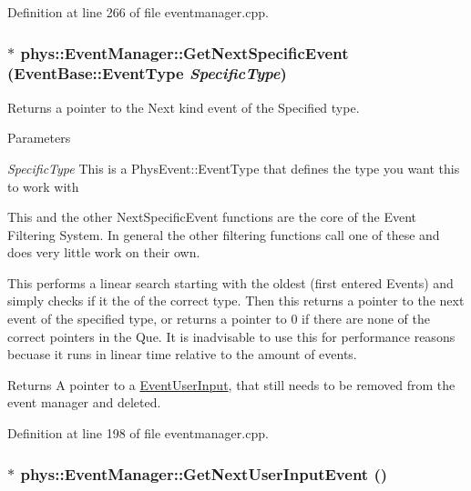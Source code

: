 Definition at line 266 of file eventmanager.cpp.

\hypertarget{classphys_1_1EventManager_a7340cfab326856cf4ebc653b11101016}{
\subsubsection[{GetNextSpecificEvent}]{ $\ast$ phys::EventManager::GetNextSpecificEvent ({\bf EventBase::EventType} {\em SpecificType})}}
\label{da/dde/classphys_1_1EventManager_a7340cfab326856cf4ebc653b11101016}


Returns a pointer to the Next kind event of the Specified type. 


\begin{DoxyParams}{Parameters}
\item[{\em SpecificType}]This is a PhysEvent::EventType that defines the type you want this to work with\end{DoxyParams}
This and the other NextSpecificEvent functions are the core of the Event Filtering System. In general the other filtering functions call one of these and does very little work on their own. \par
 This performs a linear search starting with the oldest (first entered Events) and simply checks if it the of the correct type. Then this returns a pointer to the next event of the specified type, or returns a pointer to 0 if there are none of the correct pointers in the Que. It is inadvisable to use this for performance reasons becuase it runs in linear time relative to the amount of events. \begin{DoxyReturn}{Returns}
A pointer to a \hyperlink{classphys_1_1EventUserInput}{EventUserInput}, that still needs to be removed from the event manager and deleted. 
\end{DoxyReturn}


Definition at line 198 of file eventmanager.cpp.

\hypertarget{classphys_1_1EventManager_a38b42602a3a4d621048c78b525b4db49}{
\subsubsection[{GetNextUserInputEvent}]{ $\ast$ phys::EventManager::GetNextUserInputEvent ()}}
\label{da/dde/classphys_1_1EventManager_a38b42602a3a4d621048c78b525b4db49}


